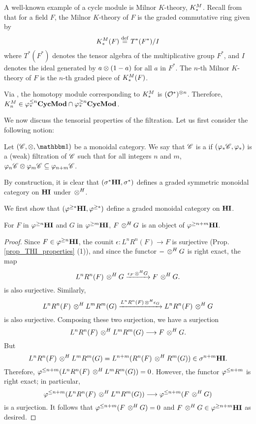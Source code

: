 \begin{ex}\label{ex_milK}
A well-known example of a cycle module is Milnor $K$-theory,
$K^M_*$. Recall from \cite{MilK} that for a field $F$, the
Milnor $K$-theory of $F$ is the graded commutative ring given by
\[
K^M_*(F) \stackrel{\mathrm{def}}{=} T^*(F^*)/I
\]
where $T^*(F^*)$ denotes the tensor algebra of the multiplicative 
group $F^*$, and $I$ denotes the ideal generated by $a \otimes 
(1 - a)$ for all $a$ in $F^*$. The $n$-th Milnor $K$-theory of $F$ 
is the $n$-th graded piece of $K^M_*(F)$.

Via \cite[3.7]{DegModHom}, the homotopy module corresponding to 
$K^M_*$ is $(\mathcal{O}^*)^{\otimes n}$. Therefore, $K^M_n \in
\varphi^{\leq n}_{*}\mathbf{CycMod} \cap \varphi^{\geq n}_{*}\mathbf{CycMod}$.
\end{ex}

We now discuss the tensorial properties of the filtration. Let us
first consider the following notion:

\begin{defn}\label{def_graded_tensor}
Let $(\Cat{C}, \tensor, \Unit)$ be a monoidal category.
We say that $\mathscr{C}$ is a  if $(\varphi_*\mathscr{C}, \varphi_*)$ is a 
(weak) filtration of $\mathscr{C}$ such that for all integers $n$
and $m$, $\varphi_n\mathscr{C} \otimes \varphi_m\mathscr{C} \subseteq
\varphi_{n + m}\mathscr{C}$.
\end{defn}

\begin{ex}
By construction, it is clear that $(\sigma^{*}\mathbf{HI}, \sigma^{*})$ 
defines a graded symmetric monoidal category on $\mathbf{HI}$ under
$\,\otimes^H$.
\end{ex}

We first show that $(\varphi^{\geq *}\mathbf{HI}, \varphi^{\geq *})$ define a graded
monoidal category on $\mathbf{HI}$. 

\begin{prop}\label{prop_tensor_and_tfilt_HI}
For $F$ in $\varphi^{\geq n}\mathbf{HI}$ and $G$ in $\varphi^{\geq m}\mathbf{HI}$, $F \,\otimes^H G$
is an object of $\varphi^{\geq n + m}\mathbf{HI}$.
\end{prop}
\begin{proof}
Since $F \in \varphi^{\geq n}\mathbf{HI}$, the counit $\epsilon: L^nR^n(F) \to F$ 
is surjective (Prop.  \ref{prop_THI_properties} (1)), and since 
the functor $- \,\otimes^H G$ is right exact, the map
\[
L^nR^n(F) \,\otimes^H G \xrightarrow{\epsilon_F \,\otimes^H G} F \,\otimes^H G.
\]
is also surjective. Similarly,
\[
L^nR^n(F) \,\otimes^H L^mR^m(G) \xrightarrow{L^nR^n(F) \,\otimes^H \epsilon_G}
L^nR^n(F) \,\otimes^H G
\]
is also surjective. Composing these two surjection, we have a 
surjection
\[
L^nR^n(F) \,\otimes^H L^mR^m(G) \longrightarrow F \,\otimes^H G.
\]
But 
\[
L^nR^n(F) \,\otimes^H L^mR^m(G) = L^{n + m}(R^n(F) \,\otimes^H R^m(G)) \in
\sigma^{n + m}\mathbf{HI}.
\]
Therefore, $\varphi^{\leq n + m}(L^nR^n(F) \,\otimes^H L^mR^m(G)) = 0$. However,
the functor $\varphi^{\leq n + m}$ is right exact; in particular, 
\[
\varphi^{\leq n + m}(L^nR^n(F) \,\otimes^H L^mR^m(G)) \longrightarrow
   \varphi^{\leq n + m}(F \,\otimes^H G)
\]
is a surjection. It follows that $\varphi^{\leq n + m}(F \,\otimes^H G) = 0$ and
$F \,\otimes^H G \in \varphi^{\geq n + m}\mathbf{HI}$ as desired.
\end{proof}

